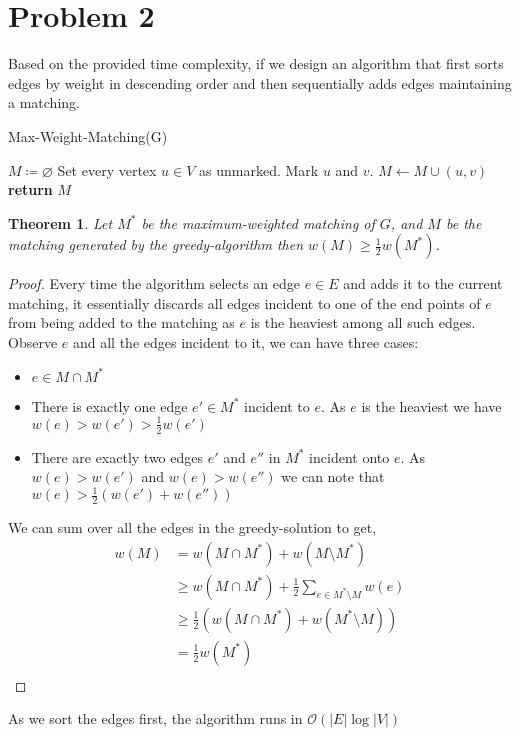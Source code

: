 \documentclass{article}
\numberwithin{equation}{section}
\newtheorem{theorem}{Theorem}
\numberwithin{theorem}{section}
\numberwithin{lemma}{section}
\newcommand{\bigOh}[1]{\mathcal{O}\left(#1\right)}
\begin{document}
\section{Problem 2}
Based on the provided time complexity, if we design an algorithm that first sorts edges by weight in descending order and then sequentially adds edges maintaining a matching. 
\begin{algorithm}
    \caption{Max-Weight-Matching(G)}
    \begin{algorithmic}[1]
        \State $M\coloneqq \varnothing$
        \State Set every vertex $u\in V$ as unmarked. 
                \State Mark $u$ and $v$. 
                \State $M \leftarrow M \cup (u, v)$
            \EndIf
        \EndFor
        \State \textbf{return} $M$
    \end{algorithmic}
\end{algorithm}
\begin{theorem}
    Let $M^*$ be the maximum-weighted matching of $G$, and $M$ be the matching generated by the greedy-algorithm then $w(M) \ge \frac{1}{2} w(M^*)$. 
\end{theorem}
\begin{proof}
   Every time the algorithm selects an edge $e\in E$ and adds it to the current matching, it essentially discards all edges incident to one of the end points of $e$ from being added to the matching as $e$ is the heaviest among all such edges. Observe $e$ and all the edges incident to it, we can have three cases:
   \begin{itemize}
       \item $e \in M \cap M^*$
       \item There is exactly one edge $e' \in M^*$ incident to $e$. As $e$ is the heaviest we have $w(e) > w(e') > \frac{1}{2}w(e')$
       \item There are exactly two edges $e'$ and $e''$ in $M^*$ incident onto $e$. As $w(e) > w(e')$ and $w(e) > w(e'')$ we can note that $w(e) > \frac{1}{2}(w(e') +w(e''))$
   \end{itemize}
   We can sum over all the edges in the greedy-solution to get, 
   \begin{equation}
       \label{e8}
       \begin{split}
           w(M) &= w(M\cap M^*) + w(M\setminus M^*)\\
           &\ge w(M\cap M^*) + \frac{1}{2} \sum_{e \in M^*\setminus M} w(e)\\
            &\ge \frac{1}{2}(w(M\cap M^*) + w(M^*\setminus M))\\
            &= \frac{1}{2}w(M^*)\\
       \end{split}
   \end{equation}
\end{proof}
As we sort the edges first, the algorithm runs in $\bigOh{|E|\log |V|}$
\newpage
\end{document}
